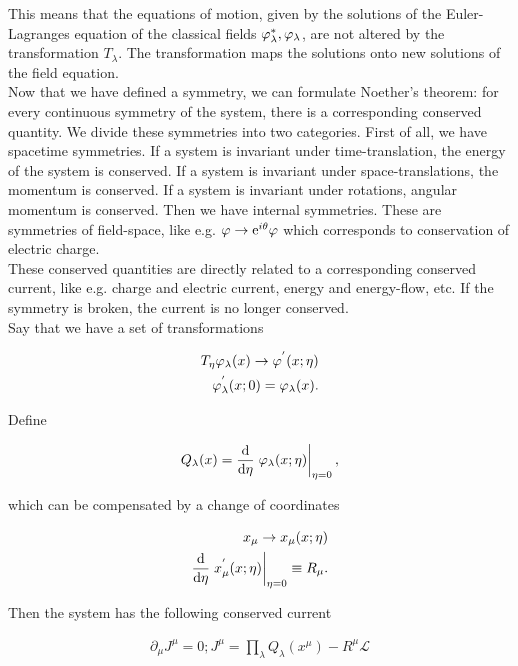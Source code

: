 This means that the equations of motion, given by the solutions of the Euler-Lagranges equation of the classical fields $\varphi_\lambda^*, \varphi_\lambda$, are not altered by the transformation $T_\lambda$. The transformation maps the solutions onto new solutions of the field equation. \\ 

Now that we have defined a symmetry, we can formulate Noether's theorem: for every continuous symmetry of the system, there is a corresponding conserved quantity. We divide these symmetries into two categories. First of all, we have spacetime symmetries. If a system is invariant under time-translation, the energy of the system is conserved. If a system is invariant under space-translations, the momentum is conserved. If a system is invariant under rotations, angular momentum is conserved. Then we have internal symmetries. These are symmetries of field-space, like e.g. $\varphi \to \mathrm{e}^{i\theta}\varphi$ which corresponds to conservation of electric charge. \\ 

These conserved quantities are directly related to a corresponding conserved current, like e.g. charge and electric current, energy and energy-flow, etc. If the symmetry is broken, the current is no longer conserved. \\ 

Say that we have a set of transformations 

\begin{align*}
    T_\eta \varphi_\lambda (x) \to \varphi^{'} (x; \eta) \\
    \varphi_\lambda^{'} (x; 0) = \varphi_\lambda (x). 
\end{align*}

Define 

\begin{align*}
    Q_\lambda (x) = \dv{}{\eta}\eval{\p_\lambda (x; \eta)}_{\eta = 0},
\end{align*}

which can be compensated by a change of coordinates 

\begin{align*}
    x_\mu \to x_\mu (x; \eta) \\ 
    \dv{}{\eta} \eval{x_\mu^{'} (x; \eta)}_{\eta = 0} \equiv R_\mu.
\end{align*}

Then the system has the following conserved current 

\begin{align*}
    \partial_\mu J^\mu = 0; J^\mu = \prod_\lambda Q_\lambda (x^\mu) - R^\mu \mathcal{L}
\end{align*}